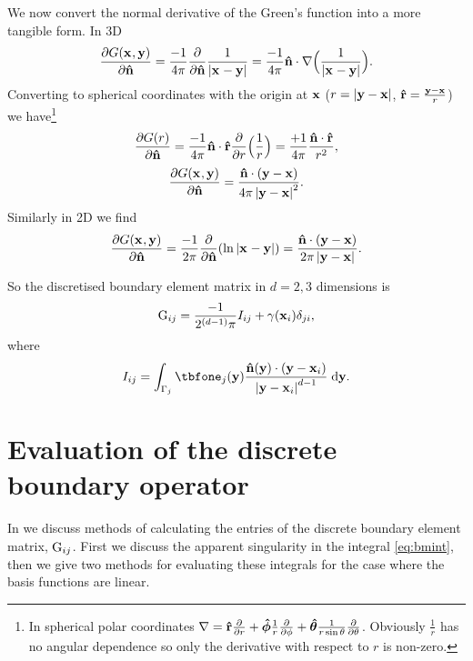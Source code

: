 We now convert the normal derivative of the Green's function into a more tangible form.
In 3D
\begin{equation}
  \label{eq:11}
  \pd{\Green}{\nv} = \frac{-1}{4 \pi} \pd{}{\nv} \Gthreed = \frac{-1}{4 \pi} \nv \cdot \grad \Big( \Gthreed \Big).
\end{equation}
Converting to spherical coordinates with the origin at $\boldsymbol{\mathrm{x}}$ ($r = \left|{\boldsymbol{\mathrm{y}} - \boldsymbol{\mathrm{x}}} \right|$, $\boldsymbol{\mathrm{\hat{r}}} = \frac{\boldsymbol{\mathrm{y}} - \boldsymbol{\mathrm{x}}}{r}$) we have\footnote{In spherical polar coordinates $\nabla = \boldsymbol{\mathrm{\hat{r}}} \frac{\partial }{\partial r} +  \boldsymbol{\mathrm{\hat{\phi}}} \frac{1}{r} \frac{\partial }{\partial \phi} + \boldsymbol{\mathrm{\hat{\theta}}} \frac{1}{r \sin \theta} \frac{\partial }{\partial \theta}$.
Obviously $\frac{1}{r}$ has no angular dependence so only the derivative with respect to $r$ is non-zero.}
\begin{equation}
  \label{eq:12}
  \pd{G(r)}{\nv} = \frac{-1}{4 \pi} \nv \cdot \ruv \pd{}{r} \Big( \frac{1}{r} \Big)
  = \frac{+1}{4 \pi}  \frac{\nv \cdot \ruv}{r^2},
\end{equation}
\begin{equation}
  \label{eq:13}
  \pd{\Green}{\nv} = \frac{\nv \cdot (\yv - \xv)}{4 \pi \abs{\yv - \xv} ^2} .
\end{equation}
Similarly in 2D we find
\begin{equation}
  \label{eq:14}
  \pd{\Green}{\nv} = \frac{-1}{2 \pi} \pd{}{\nv} (\Gtwod) = \frac{\nv \cdot (\yv - \xv)}{2 \pi \abs{\yv - \xv}}.
\end{equation}

\newcommand{\bminta}{I}
\newcommand{\bmint}{\bminta_{ij}}

So the discretised boundary element matrix in $d=2,3$ dimensions is
\begin{equation}
  \label{eq:19}
  \bm_{\ibasis\ibasisb} =\frac{-1}{2^{(d-1)} \pi} \bmint
    + \gamma(\xv_\ibasis)\delta_{\ibasisb\ibasis},
\end{equation}
where
\begin{equation}
  \bmint = \int_{\boundd_\ibasisb} \tbfone_{\ibasisb}(\yv) \frac{\nv(\yv) \cdot (\yv - \xv_\ibasis)}{\abs{\yv - \xv_\ibasis} ^{d-1}} \d \yv.
\label{eq:bmint}
\end{equation}


\section{Evaluation of the discrete boundary operator}
\label{sec:calc-integr-i_bm}

In  we discuss methods of calculating the entries of the discrete boundary element matrix, ${\mathbf{\mathrm{G}}}_{{i}{j}}$.
First we discuss the apparent singularity in the integral \cref{eq:bmint}, then we give two methods for evaluating these integrals for the case where the basis functions are linear.

